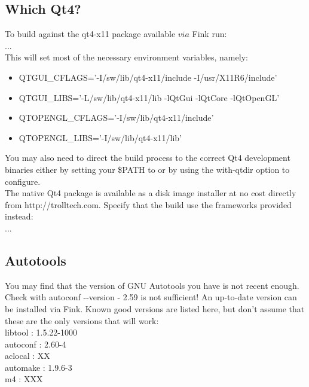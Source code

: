 \subsection{Which Qt4?}

To build against the qt4-x11 package available $via$ Fink run:\\

 ...\\

This will set most of the necessary environment variables, namely:\\
{\sffamily
\begin{itemize}
	\item QTGUI\_CFLAGS='-I/sw/lib/qt4-x11/include -I/usr/X11R6/include'
	\item QTGUI\_LIBS='-L/sw/lib/qt4-x11/lib -lQtGui -lQtCore -lQtOpenGL'
	\item QTOPENGL\_CFLAGS='-I/sw/lib/qt4-x11/include'
	\item QTOPENGL\_LIBS='-I/sw/lib/qt4-x11/lib'
\end{itemize}
}

You may also need to direct the build process to the correct Qt4 development binaries either by setting your \$PATH to  or by using the {\sffamily {-}{-}with-qtdir} option to {\sffamily configure}.\\

The native Qt4 package is available as a disk image installer at no cost directly from http://trolltech.com. Specify that the build use the frameworks provided instead:\\

 ...\\

\subsection{Autotools}
You may find that the version of GNU Autotools you have is not recent enough. Check with {\sffamily autoconf {-}{-}version} - 2.59 is not sufficient! An up-to-date version can be installed via Fink. Known good versions are listed here, but don't assume that these are the only versions that will work:\\

{\sffamily
\indent libtool  :  1.5.22-1000\\
\indent autoconf :  2.60-4\\
\indent aclocal  :  XX\\
\indent automake :  1.9.6-3\\
\indent m4       :  XXX\\
}

